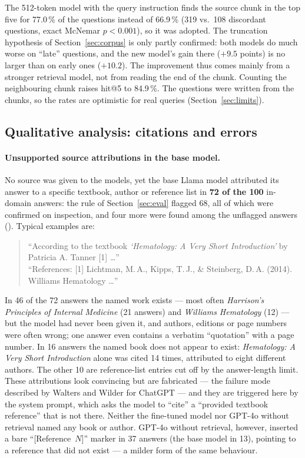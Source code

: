 The 512-token model with the query instruction finds the source chunk in the top five for 77.0\,\% of the questions instead of 66.9\,\% (319 vs.\ 108 discordant questions, exact McNemar $p < 0.001$), so it was adopted. The truncation hypothesis of Section~\ref{sec:corpus} is only partly confirmed: both models do much worse on ``late'' questions, and the new model's gain there ($+9.5$ points) is no larger than on early ones ($+10.2$). The improvement thus comes mainly from a stronger retrieval model, not from reading the end of the chunk. Counting the neighbouring chunk raises hit@5 to 84.9\,\%. The questions were written from the chunks, so the rates are optimistic for real queries (Section~\ref{sec:limits}).

\subsection{Qualitative analysis: citations and errors}\label{sec:res-qual}

\paragraph{Unsupported source attributions in the base model.} No source was given to the models, yet the base Llama model attributed its answer to a specific textbook, author or reference list in \textbf{72 of the 100} in-domain answers: the rule of Section~\ref{sec:eval} flagged 68, all of which were confirmed on inspection, and four more were found among the unflagged answers (). Typical examples are:

\begin{quote}\small
``According to the textbook \emph{`Hematology: A Very Short Introduction'} by Patricia A. Tanner [1] \ldots'' \\
``References: [1] Lichtman, M.\,A., Kipps, T.\,J., \& Steinberg, D.\,A. (2014). Williams Hematology \ldots''
\end{quote}

In 46 of the 72 answers the named work exists --- most often \emph{Harrison's Principles of Internal Medicine} (21 answers) and \emph{Williams Hematology} (12) --- but the model had never been given it, and authors, editions or page numbers were often wrong; one answer even contains a verbatim ``quotation'' with a page number. In 16 answers the named book does not appear to exist: \emph{Hematology: A Very Short Introduction} alone was cited 14 times, attributed to eight different authors. The other 10 are reference-list entries cut off by the answer-length limit. These attributions look convincing but are fabricated --- the failure mode described by Walters and Wilder for ChatGPT \cite{walters2023} --- and they are triggered here by the system prompt, which asks the model to ``cite'' a ``provided textbook reference'' that is not there. Neither the fine-tuned model nor GPT-4o without retrieval named any book or author. GPT-4o without retrieval, however, inserted a bare ``[Reference~$N$]'' marker in 37 answers (the base model in 13), pointing to a reference that did not exist --- a milder form of the same behaviour.

